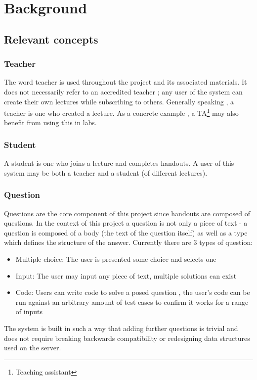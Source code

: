 \chapter{Background}
\section{Relevant concepts}

\subsection{Teacher}
The word teacher is used throughout the project and its associated materials. It does not necessarily refer to an accredited teacher ; any user of the system can create their own lectures while subscribing to others. Generally speaking , a teacher is one who created a lecture. As a concrete example , a TA\footnote{Teaching assistant} may also benefit from using this in labs.

\subsection{Student}
A student is one who joins a lecture and completes handouts. A user of this system may be both a teacher and a student (of different lectures).

\subsection{Question}
Questions are the core component of this project since handouts are composed of questions. In the context of this project a question is not only a piece of text - a question is composed of a body (the text of the question itself) as well as a type which defines the structure of the answer. Currently there are 3 types of question:

\begin{itemize}
\item Multiple choice: The user is presented some choice and selects one
\item Input: The user may input any piece of text, multiple solutions can exist
\item Code: Users can write code to solve a posed question , the user's code can be run against an arbitrary amount of test cases to confirm it works for a range of inputs
\end{itemize}

The system is built in such a way that adding further questions is trivial and does not require breaking backwards compatibility or redesigning data structures used on the server.

